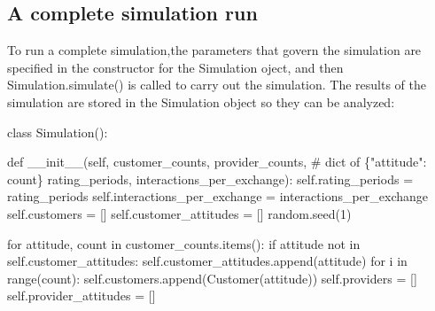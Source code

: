 \documentclass[
  letterpaper,
  DIV=11,
  numbers=noendperiod]{scrartcl}
\newenvironment{Shaded}{\begin{snugshade}}{\end{snugshade}}
\newcommand{\BuiltInTok}[1]{\textcolor[rgb]{0.00,0.23,0.31}{#1}}
\newcommand{\CommentTok}[1]{\textcolor[rgb]{0.37,0.37,0.37}{#1}}
\newcommand{\ControlFlowTok}[1]{\textcolor[rgb]{0.00,0.23,0.31}{#1}}
\newcommand{\DecValTok}[1]{\textcolor[rgb]{0.68,0.00,0.00}{#1}}
\newcommand{\FunctionTok}[1]{\textcolor[rgb]{0.28,0.35,0.67}{#1}}
\newcommand{\KeywordTok}[1]{\textcolor[rgb]{0.00,0.23,0.31}{#1}}
\newcommand{\NormalTok}[1]{\textcolor[rgb]{0.00,0.23,0.31}{#1}}
\newcommand{\OperatorTok}[1]{\textcolor[rgb]{0.37,0.37,0.37}{#1}}
\newcommand{\VariableTok}[1]{\textcolor[rgb]{0.07,0.07,0.07}{#1}}
\begin{document}
\hypertarget{a-complete-simulation-run}{%
\subsection{A complete simulation run}\label{a-complete-simulation-run}}

To run a complete simulation,the parameters that govern the simulation
are specified in the constructor for the Simulation oject, and then
Simulation.simulate() is called to carry out the simulation. The results
of the simulation are stored in the Simulation object so they can be
analyzed:

\begin{Shaded}
\begin{Highlighting}[]
\KeywordTok{class}\NormalTok{ Simulation():}

    \KeywordTok{def} \FunctionTok{\_\_init\_\_}\NormalTok{(}\VariableTok{self}\NormalTok{,}
\NormalTok{                customer\_counts,}
\NormalTok{                provider\_counts, }\CommentTok{\# dict of \{"attitude": count\}}
\NormalTok{                rating\_periods,}
\NormalTok{                interactions\_per\_exchange):}
        \VariableTok{self}\NormalTok{.rating\_periods }\OperatorTok{=}\NormalTok{ rating\_periods}
        \VariableTok{self}\NormalTok{.interactions\_per\_exchange }\OperatorTok{=}\NormalTok{ interactions\_per\_exchange}
        \VariableTok{self}\NormalTok{.customers }\OperatorTok{=}\NormalTok{ []}
        \VariableTok{self}\NormalTok{.customer\_attitudes }\OperatorTok{=}\NormalTok{ []}
\NormalTok{        random.seed(}\DecValTok{1}\NormalTok{)  }

        \ControlFlowTok{for}\NormalTok{ attitude, count }\KeywordTok{in}\NormalTok{ customer\_counts.items():}
            \ControlFlowTok{if}\NormalTok{ attitude }\KeywordTok{not} \KeywordTok{in} \VariableTok{self}\NormalTok{.customer\_attitudes:}
                \VariableTok{self}\NormalTok{.customer\_attitudes.append(attitude)}
            \ControlFlowTok{for}\NormalTok{ i }\KeywordTok{in} \BuiltInTok{range}\NormalTok{(count):}
                \VariableTok{self}\NormalTok{.customers.append(Customer(attitude))}
        \VariableTok{self}\NormalTok{.providers }\OperatorTok{=}\NormalTok{ []}
        \VariableTok{self}\NormalTok{.provider\_attitudes }\OperatorTok{=}\NormalTok{ []}
        

\end{Highlighting}
\end{Shaded}
\end{document}
